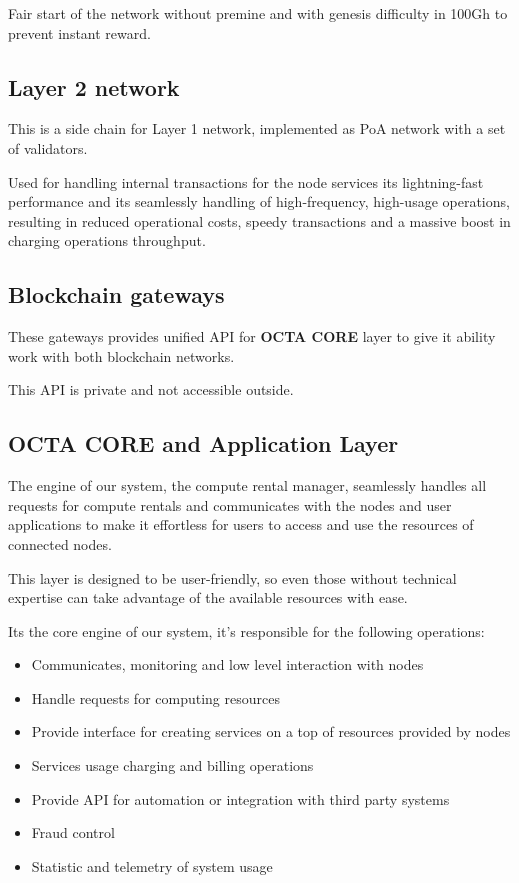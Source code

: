Fair start of the network without premine and with genesis difficulty in 100Gh to prevent instant reward.

\subsection{Layer 2 network}

This is a side chain for Layer 1 network, implemented as PoA\cite{poa} network with a set of validators.

Used for handling internal transactions for the node services its lightning-fast performance and its seamlessly handling of high-frequency, high-usage operations,
resulting in reduced operational costs, speedy transactions and a massive boost in charging operations throughput.

\subsection{Blockchain gateways}

These gateways provides unified API for \textbf{OCTA CORE} layer to give it ability work with both blockchain networks.

This API is private and not accessible outside.

\subsection{OCTA CORE and Application Layer}
The engine of our system, the compute rental manager, seamlessly handles all requests for compute rentals and communicates with the nodes and user applications to make it effortless for users to access and use the resources of connected nodes.

This layer is designed to be user-friendly, so even those without technical expertise can take advantage of the available resources with ease.

Its the core engine of our system, it's responsible for the following operations:

\begin{itemize}
    \item Communicates, monitoring and low level interaction with nodes
    \item Handle requests for computing resources
    \item Provide interface for creating services on a top of resources provided by nodes
    \item Services usage charging and billing operations
    \item Provide API for automation or integration with third party systems
    \item Fraud control
    \item Statistic and telemetry of system usage
\end{itemize}

